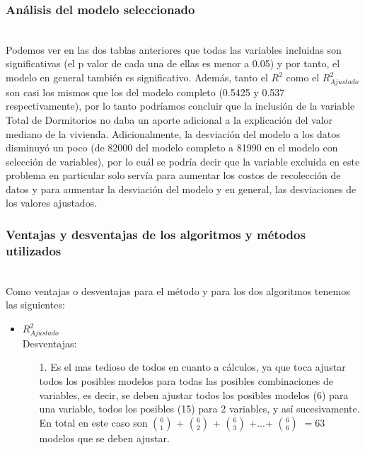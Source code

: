\documentclass[12pt]{beamer}
\begin{document}
\begin{frame}
\frametitle{Análisis del modelo seleccionado}
~\\Podemos ver en las dos tablas anteriores que todas las variables incluidas son significativas (el p valor de cada una de ellas es menor a 0.05) y por tanto, el modelo en general también es significativo. Además, tanto el $R^2$ como el $R^2_{Ajustado}$ son casi los mismos que los del modelo completo (0.5425 y 0.537 respectivamente), por lo tanto podríamos concluir que la inclusión de la variable Total de Dormitorios no daba un aporte adicional a la explicación del valor mediano de la vivienda. Adicionalmente, la desviación del modelo a los datos disminuyó un poco (de 82000 del modelo completo a 81990 en el modelo con selección de variables), por lo cuál se podría decir que la variable excluida en este problema en particular solo servía para aumentar los costos de recolección de datos y para aumentar la desviación del modelo y en general, las desviaciones de los valores ajustados.
\end{frame}

\begin{frame}
\frametitle{Ventajas y desventajas de los algoritmos y métodos utilizados}
~\\Como ventajas o desventajas para el método y para los dos algoritmos tenemos las siguientes:
\begin{itemize}
\item $R^2_{Ajustado}$
~\\Desventajas:
\begin{itemize}
\item[1.] Es el mas tedioso de todos en cuanto a cálculos, ya que toca ajustar todos los posibles modelos para todas las posibles combinaciones de variables, es decir, se deben ajustar todos los posibles modelos (6) para una variable, todos los posibles (15) para 2 variables, y así sucesivamente. En total en este caso son $6 \choose 1$ + $ 6 \choose 2$ + $ 6\choose 3$ +...+ $6\choose 6$ $=63$ modelos que se deben ajustar.
\end{itemize}
\end{itemize}
\end{frame}
\end{document}
